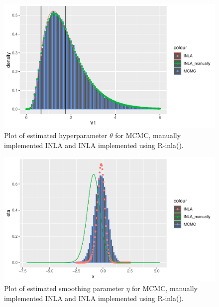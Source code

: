 \begin{figure}[h]
    \centering
    \includegraphics{Images/theta_comparison.pdf}
    \caption{Plot of estimated hyperparameter $\theta$ for MCMC, manually implemented INLA and INLA implemented using R-inla().}
    \label{fig:theta_comparison}
\end{figure}

\begin{figure}[h]
    \centering
    \includegraphics{Images/smoothing_comparison.pdf}
    \caption{Plot of estimated smoothing parameter $\eta$ for MCMC, manually implemented INLA and INLA implemented using R-inla().}
    \label{fig:smoothing_comparison}
\end{figure}

